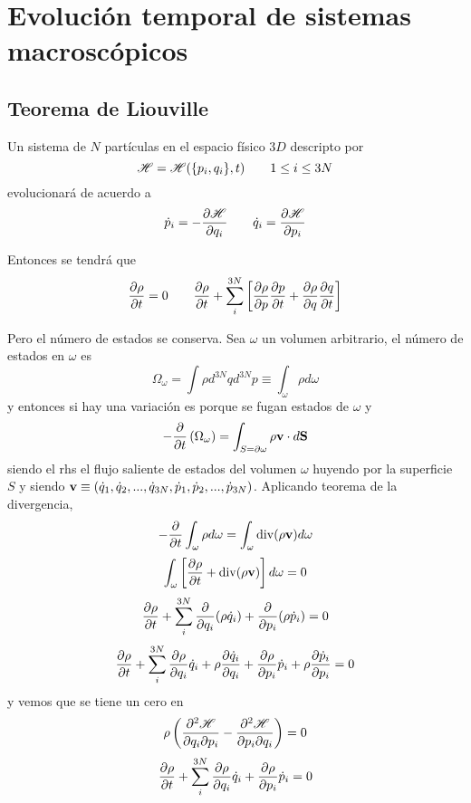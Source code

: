 \documentclass[10pt,oneside]{CBFT_book}
\begin{document}
\chapter{Evolución temporal de sistemas macroscópicos}


 \section{Teorema de Liouville}

Un sistema de $N$ partículas en el espacio físico $3D$ descripto por 
\[
	\Ham = \Ham(\{ p_i, q_i\},t) \qquad 1 \leq i \leq 3N
\]
evolucionará de acuerdo a
\[
	\dot{p}_i = -\dpar{\Ham}{q_i} \qquad \dot{q}_i = \dpar{\Ham}{p_i}
\]

Entonces se tendrá que 
\[
	\dpar{\rho}{t} = 0 \qquad \dpar{\rho}{t} + 
	\sum_i^{3N} \left[ \dpar{\rho}{p}\dpar{p}{t} + \dpar{\rho}{q}\dpar{q}{t} \right]
\]

Pero el número de estados se conserva. Sea $\omega$ un volumen arbitrario, el número de estados en
$\omega$ es
\[
	\Omega_\omega = \int \rho d^{3N}q d^{3N}p \equiv \int_\omega \rho d\omega
\]
y entonces si hay una variación es porque se fugan estados de $\omega$ y 
\[
	-\dpar{}{t} \left( \Omega_\omega \right) = \int_{S=\partial \omega} \rho \vb{v} \cdot d\vb{S}
\]
siendo el rhs el flujo saliente de estados del volumen $\omega$ huyendo por la superficie $S$ y
siendo $\vb{v} \equiv ( \dot{q}_1, \dot{q}_2, ..., \dot{q}_{3N}, \dot{p}_1, \dot{p}_2, ..., \dot{p}_{3N} )$.
Aplicando teorema de la divergencia,
\[
	-\dpar{}{t} \int_\omega \rho d\omega = \int_\omega \mathrm{div}(\rho\vb{v}) d\omega
\]
\[
	\int_\omega \left[ \dpar{\rho}{t} + \mathrm{div}(\rho\vb{v}) \right] d\omega = 0
\]
\[
	\dpar{\rho}{t} +  \sum_i^{3N} \dpar{}{q_i}(\rho\dot{q}_i) + \dpar{}{p_i}(\rho\dot{p}_i) = 0
\]
\[
	\dpar{\rho}{t} +  \sum_i^{3N} \dpar{\rho}{q_i} \dot{q}_i + \rho\dpar{\dot{q}_i}{q_i}  +
	\dpar{\rho}{p_i} \dot{p}_i + \rho\dpar{\dot{p}_i}{p_i} = 0
\]
y vemos que se tiene un cero en
\[
	\rho \left( \dparcru{\Ham}{p_i}{q_i} - \dparcru{\Ham}{q_i}{p_i} \right) = 0 
\]
\[
	\dpar{\rho}{t} +  \sum_i^{3N} \dpar{\rho}{q_i} \dot{q}_i + \dpar{\rho}{p_i} \dot{p}_i = 0
\]
\end{document}

